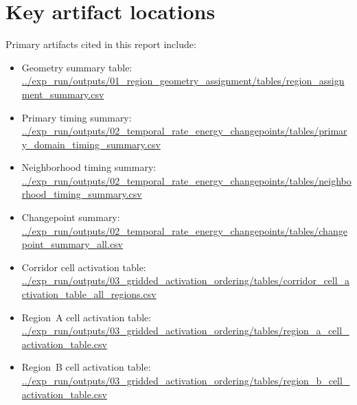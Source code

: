 \documentclass[11pt]{article}
\begin{document}
\section*{Key artifact locations}
Primary artifacts cited in this report include:
\begin{itemize}
    \item Geometry summary table: \url{../exp_run/outputs/01_region_geometry_assignment/tables/region_assignment_summary.csv}
    \item Primary timing summary: \url{../exp_run/outputs/02_temporal_rate_energy_changepoints/tables/primary_domain_timing_summary.csv}
    \item Neighborhood timing summary: \url{../exp_run/outputs/02_temporal_rate_energy_changepoints/tables/neighborhood_timing_summary.csv}
    \item Changepoint summary: \url{../exp_run/outputs/02_temporal_rate_energy_changepoints/tables/changepoint_summary_all.csv}
    \item Corridor cell activation table: \url{../exp_run/outputs/03_gridded_activation_ordering/tables/corridor_cell_activation_table_all_regions.csv}
    \item Region~A cell activation table: \url{../exp_run/outputs/03_gridded_activation_ordering/tables/region_a_cell_activation_table.csv}
    \item Region~B cell activation table: \url{../exp_run/outputs/03_gridded_activation_ordering/tables/region_b_cell_activation_table.csv}
\end{itemize}
\end{document}

